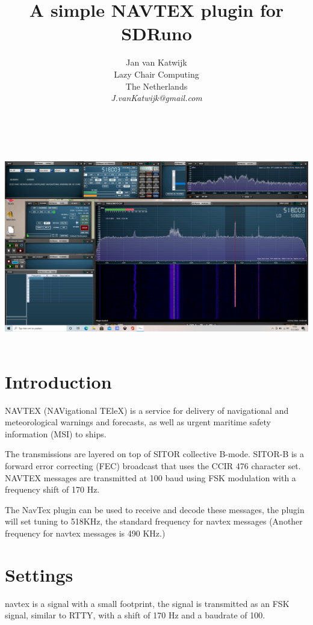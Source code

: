 \documentclass[11pt]{article}
\begin{document}
\title{A simple NAVTEX plugin for SDRuno}
\author{
Jan van Katwijk\\
Lazy Chair Computing \\
The Netherlands\\
{\em J.vanKatwijk@gmail.com}}
\maketitle
\ \\
\ \\
\includegraphics[width=140mm]{navtex-example.png}
\ \\
\section{Introduction}
NAVTEX (NAVigational TEleX) is a service for delivery of navigational and meteorological warnings and forecasts, as well as urgent maritime safety information (MSI) to ships. 

The transmissions are layered on top of SITOR collective B-mode. SITOR-B is a forward error correcting (FEC) broadcast that uses the CCIR 476 character set. NAVTEX messages are transmitted at 100 baud using FSK modulation with a frequency shift of 170 Hz.

The NavTex plugin can be used to receive and decode these messages,
the plugin will set tuning to 518KHz, the standard frequency for 
navtex messages (Another frequency for navtex messages is 490 KHz.)

\section{Settings}
navtex is a signal with a small footprint, the signal is transmitted as
an FSK signal, similar to RTTY, with a shift of  170 Hz and a baudrate of
100.
\end{document}
